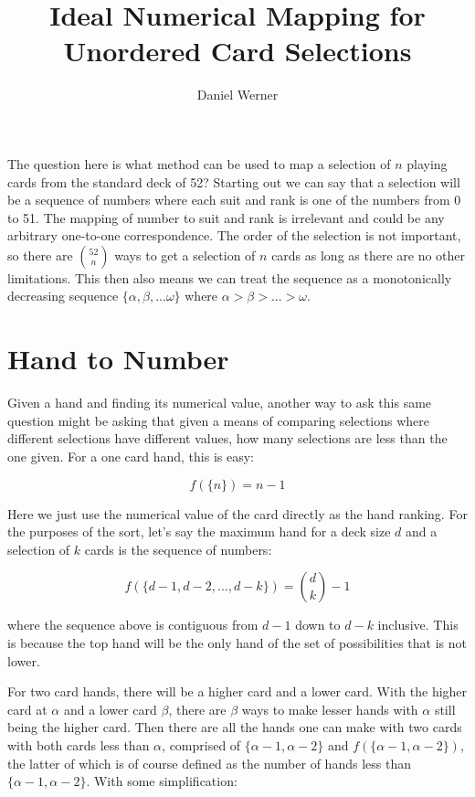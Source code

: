\documentclass{article}
\title{Ideal Numerical Mapping for Unordered Card Selections}
\author{Daniel Werner}
\begin{document}
\maketitle

The question here is what method can be used to map a selection of $n$ playing cards from the standard deck of 52?  Starting out we can say that a selection will be a sequence of numbers where each suit and rank is one of the numbers from 0 to 51. The mapping of number to suit and rank is irrelevant and could be any arbitrary one-to-one correspondence.  The order of the selection is not important, so there are ${52 \choose n}$ ways to get a selection of $n$ cards as long as there are no other limitations.  This then also means we can treat the sequence as a monotonically decreasing sequence $\{\alpha,\beta,...\omega\}$ where $\alpha > \beta > ... > \omega$.

\par

\section*{Hand to Number}

Given a hand and finding its numerical value, another way to ask this same question might be asking that given a means of comparing selections where different selections have different values, how many selections are less than the one given. For a one card hand, this is easy:

\begin{equation}
    f(\{n\}) = n - 1
\end{equation}

Here we just use the numerical value of the card directly as the hand ranking.  For the purposes of the sort, let's say the maximum hand for a deck size $d$ and a selection of $k$ cards is the sequence of numbers:

\begin{equation}
    f(\{d - 1, d - 2, ..., d - k\}) = {d \choose k} - 1
\end{equation}

where the sequence above is contiguous from $d - 1$ down to $d - k$ inclusive.  This is because the top hand will be the only hand of the set of possibilities that is not lower.

\par

For two card hands, there will be a higher card and a lower card.  With the higher card at $\alpha$ and a lower card $\beta$, there are $\beta$ ways to make lesser hands with $\alpha$ still being the higher card.  Then there are all the hands one can make with two cards with both cards less than $\alpha$, comprised of $\{\alpha - 1, \alpha -2\}$ and $f(\{\alpha - 1, \alpha -2\})$, the latter of which is of course defined as the number of hands less than $\{\alpha - 1, \alpha -2\}$. With some simplification:
\end{document}
